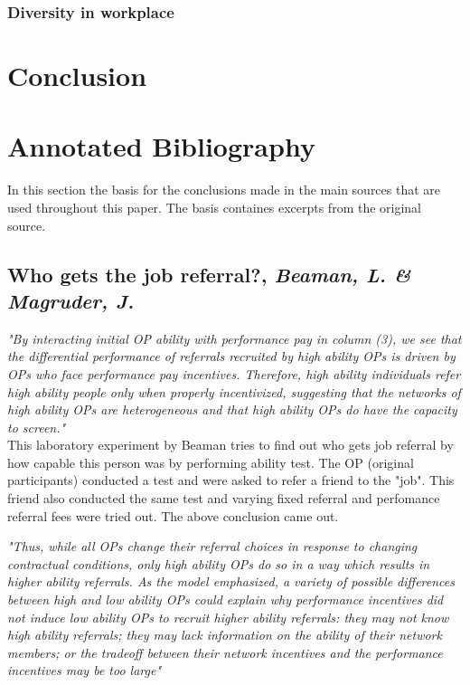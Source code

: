 \documentclass[a4paper, 11pt]{article} %
\begin{document}
\subsubsection{Diversity in workplace}



\section*{Conclusion}

\section*{Annotated Bibliography}
In this section the basis for the conclusions made in the main sources that are used throughout this paper. The basis containes excerpts from the original source.

\subsection*{Who gets the job referral?, \emph{Beaman, L. \& Magruder, J.} \cite{first}}

\emph{"By interacting initial OP ability with performance pay in column (3), we see that the differential
performance of referrals recruited by high ability OPs is driven by OPs who face performance
pay incentives. Therefore, high ability individuals refer high ability people only when properly
incentivized, suggesting that the networks of high ability OPs are heterogeneous and that high
ability OPs do have the capacity to screen."}\\

This laboratory experiment by Beaman tries to find out who gets job referral by how capable this person was by performing ability test. The OP (original participants) conducted a test and were asked to refer a friend to the "job". This friend also conducted the same test and varying fixed referral and perfomance referral fees were tried out. The above conclusion came out.

\emph{"Thus, while all OPs change their referral choices in response to changing contractual conditions,
only high ability OPs do so in a way which results in higher ability referrals. As the model
emphasized, a variety of possible differences between high and low ability OPs could explain why
performance incentives did not induce low ability OPs to recruit higher ability referrals: they
may not know high ability referrals; they may lack information on the ability of their network
members; or the tradeoff between their network incentives and the performance incentives may
be too large"}\\
\end{document}
